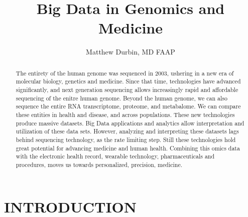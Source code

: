 \documentclass[sigconf]{acmart}
\begin{document}
\title{Big Data in Genomics and Medicine}


\author{Matthew Durbin, MD FAAP}

\renewcommand{\shortauthors}{M. Durbin}





\begin{abstract}
The entirety of the human genome was sequenced in 2003, ushering in a new era of molecular biology, genetics and medicine.  Since that time, technologies have advanced significantly, and next generation sequencing allows increasingly rapid and affordable sequencing of the enitre human genome.  Beyond the human genome, we can also sequence the entire RNA transcriptome, proteome, and metabalome.  We can compare these entities in health and disease, and across populations.  These new technologies produce massive datasets.  Big Data applications and analytics allow interpretation and utilization of these data sets.  However, analyzing and interpreting these datasets lags behind sequencing technology, as the rate limiting step. Still these technologies hold great potential for advancing medicine and human health.  Combining this omics data with the electronic health record, wearable technology, pharmaceuticals and procedures, moves us towards personalized, precision, medicine.     
\end{abstract}

\maketitle




\section{INTRODUCTION}
\end{document}
